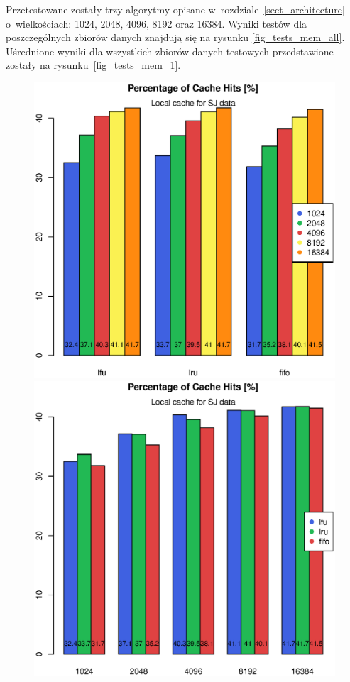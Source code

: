 \documentclass[a4paper,11pt]{scrartcl}
\begin{document}
Przetestowane zostały trzy algorytmy opisane w~rozdziale~\ref{sect_architecture} o~wielkościach: 1024, 2048, 4096, 8192 oraz 16384. 
Wyniki testów dla poszczególnych zbiorów danych znajdują się na rysunku \ref{fig_tests_mem_all}. Uśrednione wyniki dla wszystkich zbiorów danych testowych przedstawione zostały na rysunku~\ref{fig_tests_mem_1}.

\begin{figure}[h!]
\centering
\begin{minipage}{0.48\linewidth}
\centering
\includegraphics[width=0.9\linewidth]{img/tests/nop2p_sj_1.eps}
\end{minipage}
\begin{minipage}{0.48\linewidth}
\centering
\includegraphics[width=0.9\linewidth]{img/tests/nop2p_sj_2.eps}

\end{minipage}
\end{figure}
\end{document}
